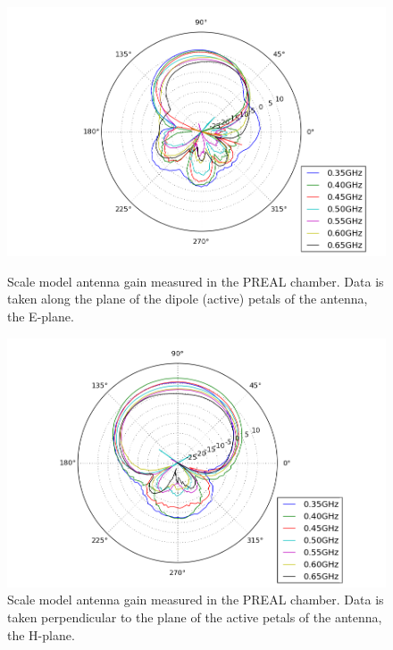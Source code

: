 \begin{figure}[htb]
\centering
\begin{minipage}[b]{0.46\textwidth}
\centering
\includegraphics[width=0.95\linewidth]{SCIHI_system/figures/HIbiscus_Gain_model_H_polar.png}
\caption{Scale model antenna gain measured in the PREAL chamber. Data is taken along the plane of the dipole (active) petals of the antenna, the E-plane. }
\label{Fig:eplane_gain_sm}
\end{minipage}%
\begin{minipage}[b]{0.02\textwidth}
\hspace{1cm}
\end{minipage}%
\begin{minipage}[b]{0.48\textwidth}
\centering
\includegraphics[width=0.95\linewidth]{SCIHI_system/figures/HIbiscus_Gain_model_V_polar.png}
\caption{Scale model antenna gain measured in the PREAL chamber. Data is taken perpendicular to the plane of the active petals of the antenna, the H-plane. }
\label{Fig:hplane_gain_sm}
\end{minipage}
\end{figure}

